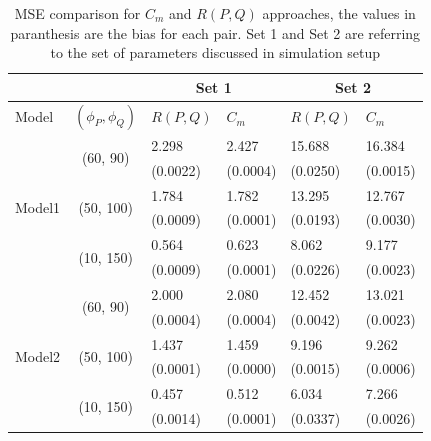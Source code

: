 \begin{table}[H]
\label{parameters}
\centering
\begin{tabular}{|l|c|l|l|l|l|}
\hline
\multicolumn{2}{|c|}{}      & \multicolumn{2}{|c|}{Set 1} & \multicolumn{2}{|c|}{Set 2}  \\ \hline
Model & $(\phi_P, \phi_Q)$  & $R(P,Q)$  & $C_m$           & $R(P,Q)$  & $C_m$  \\ \hline
\multirow{6}{*}{Model1} & \multirow{2}{*}{(60, 90)}  & 2.298    & 2.427	  & 15.688	& 16.384	 \\
                        & &                            (0.0022) & (0.0004)& (0.0250)& (0.0015)	\\ \cline{2-6}
                        & \multirow{2}{*}{(50, 100)} & 1.784    & 1.782	  & 13.295 	& 12.767 	 \\
                        & &                            (0.0009) &(0.0001) & (0.0193)& (0.0030) 	 \\ \cline{2-6}
                        & \multirow{2}{*}{(10, 150)} & 0.564    & 0.623	  & 8.062	  & 9.177	 \\ 
                        & &                            (0.0009) &(0.0001) & (0.0226)& (0.0023)	 \\ \hline
\multirow{6}{*}{Model2} & \multirow{2}{*}{(60, 90)}  & 2.000    & 2.080	  & 12.452	& 13.021	 \\
                        & &                            (0.0004) & (0.0004)& (0.0042) & (0.0023)	\\ \cline{2-6}
                        & \multirow{2}{*}{(50, 100)} & 1.437    & 1.459	  & 9.196	  & 9.262 	 \\
                        & &                            (0.0001) &(0.0000) & (0.0015)& (0.0006) 	 \\ \cline{2-6}
                        & \multirow{2}{*}{(10, 150)} & 0.457    & 0.512	  & 6.034	  & 7.266	 \\ 
                        & &                            (0.0014) &(0.0001) & (0.0337)& (0.0026)	 \\ \hline
\end{tabular}

\caption[MSE comparison for $C_m$ and $R(P,Q)$ approaches, the values in paranthesis]{MSE comparison for $C_m$ and $R(P,Q)$ approaches, the values in paranthesis are the bias for each pair.  Set 1 and Set 2 are referring to the set of parameters discussed in simulation setup}
\end{table}

